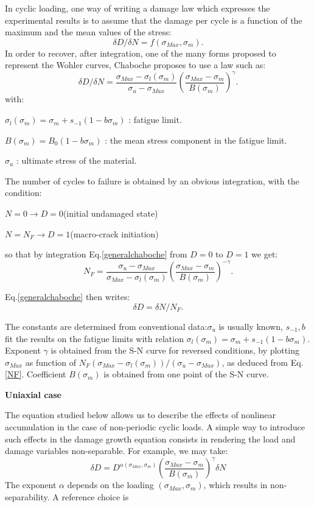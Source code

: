 In cyclic loading, one way of writing a damage law which expresses the experimental results is to assume that the damage per cycle is a function of the maximum and the mean values of the stress:
$$\delta D/\delta N=f(\sigma_{Max},\sigma_m).$$
In order to recover, after integration, one of the many forms proposed to represent the Wohler curves, Chaboche proposes to use a law such as:
\begin{equation}
\delta D/\delta N=\frac{\sigma_{Max}-\sigma_l(\sigma_m)}{\sigma_{u}-\sigma_{Max}}\left( \frac{\sigma_{Max}-\sigma_m}{B(\sigma_m)}\right) ^{\gamma}.
\label{generalchaboche}
\end{equation}
with:

$\sigma_l(\sigma_m)=\sigma_m+s_{-1}(1-b\sigma_m)$ :  fatigue limit.

$B(\sigma_m)=B_0(1-b\sigma_m)$ : the mean stress component in the fatigue limit.

$\sigma_u$ : ultimate stress of the material.

The number of cycles to failure is obtained by an obvious integration, with the condition:

$N=0 \to D=0$(initial undamaged state)

$N=N_F \to D=1$(macro-crack initiation)

so that by integration Eq.\eqref{generalchaboche} from $D=0$ to $D=1$ we get:
\begin{equation}N_F=\frac{\sigma_{u}-\sigma_{Max}}{\sigma_{Max}-\sigma_l(\sigma_m)}\left(\frac{\sigma_{Max}-\sigma_m}{B(\sigma_m)}\right)^{-\gamma}.
\label{NF}
\end{equation}

Eq.\eqref{generalchaboche} then writes:
$$\delta D=\delta N/N_F.$$

The constants are determined from conventional data:$\sigma_u$ is usually known, $s_{-1},b$ fit the results on the fatigue limits with relation $\sigma_l(\sigma_m)=\sigma_m+s_{-1}(1-b\sigma_m)$. Exponent $\gamma$ is obtained from the S-N curve for reversed conditions, by plotting $\sigma_{Max}$ as function of $N_F(\sigma_{Max}-\sigma_l(\sigma_m))/(\sigma_{u}-\sigma_{Max})$, as deduced from Eq.\eqref{NF}. Coefficient $B(\sigma_m)$ is obtained from one point of the S-N curve.

\vspace{6pt}
\textbf{Uniaxial case}
\vspace{6pt}

The equation studied below allows us to describe the effects of nonlinear accumulation in the case of non-periodic cyclic loads\cite{FFE:FFE1}. A simple way to introduce such effects in the damage growth equation consists in rendering the load and damage variables non-separable. For example, we may take:
$$\delta D=D^{\alpha(\sigma_{Max},\sigma_m)}\left(\frac{\sigma_{Max}-\sigma_m}{B(\sigma_m)}\right)^\gamma\delta N$$
The exponent $\alpha$ depends on the loading $(\sigma_{Max},\sigma_m)$, which results in non-separability. A reference choice is

